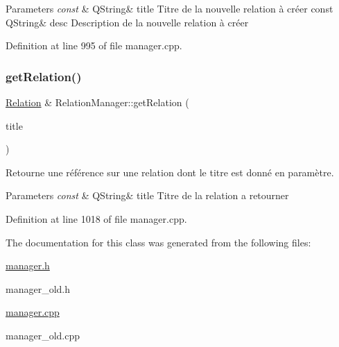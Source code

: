 \begin{DoxyParams}{Parameters}
{\em const} & Q\+String\& title Titre de la nouvelle relation à créer const Q\+String\& desc Description de la nouvelle relation à créer \\
\hline
\end{DoxyParams}


Definition at line 995 of file manager.\+cpp.

\mbox{\label{class_relation_manager_ad9ffbaba761149560d915f081d379ecc}} 
\subsubsection{\texorpdfstring{get\+Relation()}{getRelation()}}
{\footnotesize\ttfamily \hyperlink{class_relation}{Relation} \& Relation\+Manager\+::get\+Relation (\begin{DoxyParamCaption}\item[{const Q\+String \&}]{title }\end{DoxyParamCaption})}



Retourne une référence sur une relation dont le titre est donné en paramètre. 


\begin{DoxyParams}{Parameters}
{\em const} & Q\+String\& title Titre de la relation a retourner \\
\hline
\end{DoxyParams}


Definition at line 1018 of file manager.\+cpp.



The documentation for this class was generated from the following files\+:\begin{DoxyCompactItemize}
\item 
\hyperlink{manager_8h}{manager.\+h}\item 
manager\+\_\+old.\+h\item 
\hyperlink{manager_8cpp}{manager.\+cpp}\item 
manager\+\_\+old.\+cpp\end{DoxyCompactItemize}

